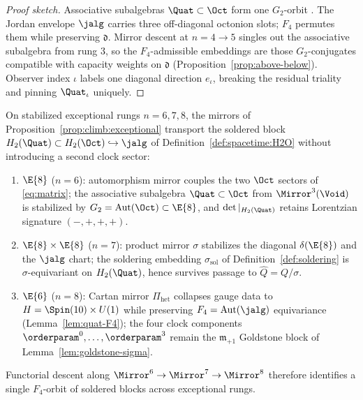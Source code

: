 \begin{proof}[Proof sketch]
Associative subalgebras $\Quat\subset\Oct$ form one $G_2$-orbit
\cite{SpringerVeldkamp2000}. The Jordan envelope $\jalg$ carries three
off-diagonal octonion slots; $F_4$ permutes them while preserving
$\mathfrak{d}$. Mirror descent at $n=4\to5$ singles out the associative
subalgebra from rung $3$, so the $F_4$-admissible embeddings are those
$G_2$-conjugates compatible with capacity weights on $\mathfrak{d}$
(Proposition~\ref{prop:above-below}). Observer index $\iota$ labels one
diagonal direction $e_\iota$, breaking the residual triality and pinning
$\Quat_\iota$ uniquely.
\end{proof}

\begin{proposition}
\label{prop:soldering-transport}
On stabilized exceptional rungs $n=6,7,8$, the mirrors of
Proposition~\ref{prop:climb:exceptional} transport the soldered block
$H_2(\Quat)\subset H_2(\Oct)\hookrightarrow\jalg$ of
Definition~\ref{def:spacetime:H2O} without introducing a second clock sector:
\begin{enumerate}[label=(\roman*),leftmargin=*]
  \item $\E{8}$ ($n=6$): automorphism mirror couples the two $\Oct$ sectors of
    \eqref{eq:matrix}; the associative subalgebra $\Quat\subset\Oct$ from
    $\Mirror^3(\Void)$ is stabilized by $G_2=\mathrm{Aut}(\Oct)\subset\E{8}$,
    and $\det|_{H_2(\Quat)}$ retains Lorentzian signature $(-,+,+,+)$.
  \item $\E{8}\times\E{8}$ ($n=7$): product mirror $\sigma$ stabilizes the
    diagonal $\delta(\E{8})$ and the $\jalg$ chart; the soldering embedding
    $\sigma_{\mathrm{sol}}$ of Definition~\ref{def:soldering} is
    $\sigma$-equivariant on $H_2(\Quat)$, hence survives passage to
    $\hat Q=Q/\sigma$.
  \item $\E{6}$ ($n=8$): Cartan mirror $\Pi_{\mathrm{het}}$ collapses gauge data
    to $H=\Spin(10)\times U(1)$ while preserving $F_4=\mathrm{Aut}(\jalg)$
    equivariance (Lemma~\ref{lem:quat-F4}); the four clock components
    $\orderparam^0,\ldots,\orderparam^3$ remain the $\mathfrak{m}_{+1}$
    Goldstone block of Lemma~\ref{lem:goldstone-sigma}.
\end{enumerate}
Functorial descent along $\Mirror^6\to\Mirror^7\to\Mirror^8$ therefore
identifies a single $F_4$-orbit of soldered blocks across exceptional rungs.
\end{proposition}

